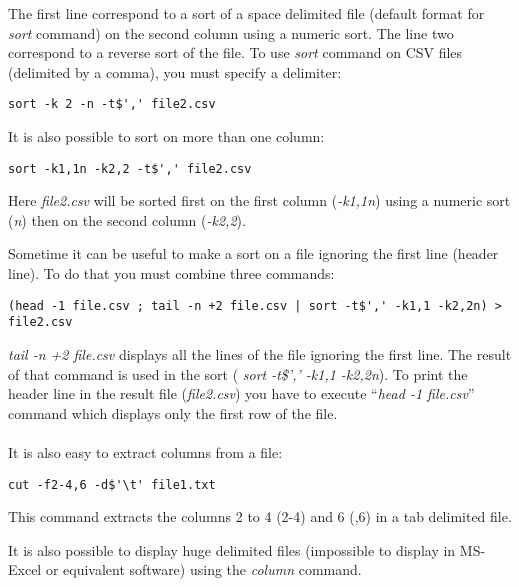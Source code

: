 \documentclass[two_sides]{my_article}
\begin{document}
The first line correspond to a sort of a space delimited file (default format for \emph{sort} command) on the second column using a numeric sort. The line two correspond to a reverse sort of the file. To use \emph{sort} command on CSV files (delimited by a comma), you must specify a delimiter:

\begin{lstlisting}[frame=lines, numbers=none]
sort -k 2 -n -t$',' file2.csv
\end{lstlisting}

It is also possible to sort on more than one column:
\begin{lstlisting}[frame=lines, numbers=none]
sort -k1,1n -k2,2 -t$',' file2.csv
\end{lstlisting}

Here \emph{file2.csv} will be sorted first on the first column (\emph{-k1,1n}) using a numeric sort (\emph{n}) then on the second column (\emph{-k2,2}).

Sometime it can be useful to make a sort on a file ignoring the first line (header line). To do that you must combine three commands:

\begin{lstlisting}[frame=lines, numbers=none]
(head -1 file.csv ; tail -n +2 file.csv | sort -t$',' -k1,1 -k2,2n) > file2.csv
\end{lstlisting}

\emph{tail -n +2 file.csv} displays all the lines of the file ignoring the first line. The result of that command is used in the sort (\emph{ sort -t\$',' -k1,1 -k2,2n}). To print the header line in the result file (\emph{file2.csv}) you have to execute ``\emph{head -1 file.csv}'' command which displays only the first row of the file. 

\paragraph{}
It is also easy to extract columns from a file:

\begin{lstlisting}[frame=lines, numbers=none]
cut -f2-4,6 -d$'\t' file1.txt
\end{lstlisting}

This command extracts the columns 2 to 4 (2-4) and 6 (,6) in a tab delimited file.

It is also possible to display huge delimited files (impossible to display in MS-Excel or equivalent software) using the \emph{column} command.
\end{document}
